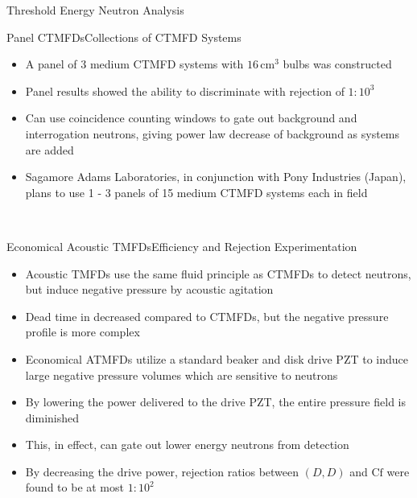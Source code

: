 \begin{cell}{6}{12}{Threshold Energy Neutron Analysis}{}
  \hspace*{\fill}
  \begin{cell}{2}{3}{Panel CTMFDs}{Collections of CTMFD Systems}
    \begin{itemize}
      \item A panel of 3 medium CTMFD systems with $16\,\mathrm{cm^{3}}$ bulbs was constructed
      \item Panel results showed the ability to discriminate with rejection of $1:10^{3}$
      \item Can use coincidence counting windows to gate out background and interrogation neutrons, giving power law decrease of background as systems are added
      \item Sagamore Adams Laboratories, in conjunction with Pony Industries (Japan), plans to use 1 - 3 panels of 15 medium CTMFD systems each in field
    \end{itemize}
  \end{cell}%
  \hspace*{\fill}
  \begin{cell}{2}{3}{}{}
  \end{cell} \\
  \vspace*{\fill}
  \begin{cell}{3}{3}{Economical Acoustic TMFDs}{Efficiency and Rejection Experimentation}
    \begin{itemize}
      \item Acoustic TMFDs use the same fluid principle as CTMFDs to detect neutrons, but induce negative pressure by acoustic agitation
      \item Dead time in decreased compared to CTMFDs, but the negative pressure profile is more complex
      \item Economical ATMFDs utilize a standard beaker and disk drive PZT to induce large negative pressure volumes which are sensitive to neutrons
      \item By lowering the power delivered to the drive PZT, the entire pressure field is diminished
      \item This, in effect, can gate out lower energy neutrons from detection
      \item By decreasing the drive power, rejection ratios between $\left(D,D\right)$ and $\mathrm{Cf}$ were found to be at most $1:10^{2}$
    \end{itemize}

\end{cell}
\end{cell}
